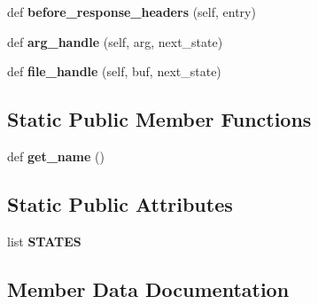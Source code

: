 \begin{DoxyCompactItemize}
def {\bfseries before\+\_\+response\+\_\+headers} (self, entry)
\item 
\mbox{\label{class_r_a_i_d5_1_1common_1_1services_1_1form__service_1_1_file_form_service_a46211cc9ccaede54578f17b02e9493ff}} 
def {\bfseries arg\+\_\+handle} (self, arg, next\+\_\+state)
\item 
\mbox{\label{class_r_a_i_d5_1_1common_1_1services_1_1form__service_1_1_file_form_service_a2c5a8072bcbb001432a90afd81db42c3}} 
def {\bfseries file\+\_\+handle} (self, buf, next\+\_\+state)
\end{DoxyCompactItemize}
\subsection*{Static Public Member Functions}
\begin{DoxyCompactItemize}
\item 
\mbox{\label{class_r_a_i_d5_1_1common_1_1services_1_1form__service_1_1_file_form_service_a8392d7038cfb99930294b170a34d10cb}} 
def {\bfseries get\+\_\+name} ()
\end{DoxyCompactItemize}
\subsection*{Static Public Attributes}
\begin{DoxyCompactItemize}
\item 
list {\bfseries S\+T\+A\+T\+ES}
\end{DoxyCompactItemize}


\subsection{Member Data Documentation}
\mbox{\label{class_r_a_i_d5_1_1common_1_1services_1_1form__service_1_1_file_form_service_a41a5dfe1b65d48a709f13d6e23f08f3a}} 
